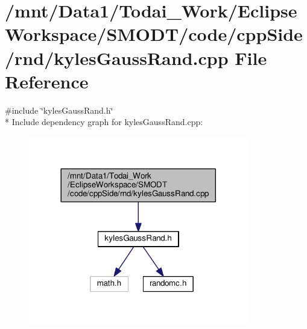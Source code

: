 \section{/mnt/\-Data1/\-Todai\-\_\-\-Work/\-Eclipse\-Workspace/\-S\-M\-O\-D\-T/code/cpp\-Side/rnd/kyles\-Gauss\-Rand.cpp File Reference}
\label{kyles_gauss_rand_8cpp}
{\ttfamily \#include \char`\"{}kyles\-Gauss\-Rand.\-h\char`\"{}}\\*
Include dependency graph for kyles\-Gauss\-Rand.\-cpp\-:
\nopagebreak
\begin{figure}[H]
\begin{center}
\leavevmode
\includegraphics[width=272pt]{kyles_gauss_rand_8cpp__incl}
\end{center}
\end{figure}
